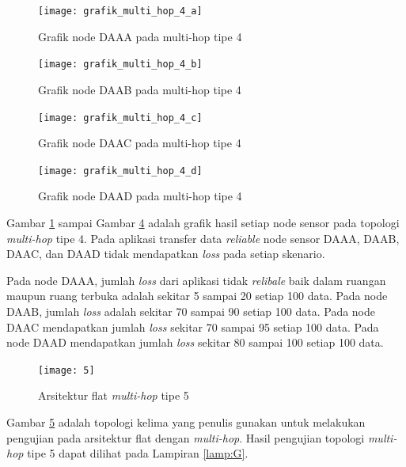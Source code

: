 \begin{figure}[H]
	\centering
	\texttt{[image: grafik\_multi\_hop\_4\_a]}
	\caption{Grafik node DAAA pada multi-hop tipe 4}
	\label{fig:grafik_multi_hop_4_a}
\end{figure}
\begin{figure}[H]
	\centering
	\texttt{[image: grafik\_multi\_hop\_4\_b]}
	\caption{Grafik node DAAB pada multi-hop tipe 4}
	\label{fig:grafik_multi_hop_4_b}
\end{figure}
\begin{figure}[H]
	\centering
	\texttt{[image: grafik\_multi\_hop\_4\_c]}
	\caption{Grafik node DAAC pada multi-hop tipe 4}
	\label{fig:grafik_multi_hop_4_c}
\end{figure}
\begin{figure}[H]
	\centering
	\texttt{[image: grafik\_multi\_hop\_4\_d]}
	\caption{Grafik node DAAD pada multi-hop tipe 4}
	\label{fig:grafik_multi_hop_4_d}
\end{figure}
Gambar \ref{fig:grafik_multi_hop_4_a} sampai Gambar \ref{fig:grafik_multi_hop_4_d} adalah grafik hasil setiap node sensor pada topologi \textit{multi-hop} tipe 4. Pada aplikasi transfer data \textit{reliable} node sensor DAAA, DAAB, DAAC, dan DAAD tidak mendapatkan \textit{loss} pada setiap skenario.

Pada node DAAA, jumlah \textit{loss} dari aplikasi tidak \textit{relibale} baik dalam ruangan maupun ruang terbuka adalah sekitar  5 sampai 20 setiap 100 data. Pada node DAAB, jumlah \textit{loss} adalah sekitar 70 sampai 90 setiap 100 data. Pada node DAAC mendapatkan jumlah \textit{loss} sekitar 70 sampai 95 setiap 100 data. Pada node DAAD mendapatkan jumlah \textit{loss} sekitar 80 sampai 100 setiap 100 data.

\begin{figure}[H]
	\centering
	\texttt{[image: 5]}
	\caption{Arsitektur flat \textit{multi-hop} tipe 5}
	\label{fig:5}
\end{figure}
Gambar \ref{fig:5} adalah topologi kelima yang penulis gunakan untuk melakukan pengujian pada arsitektur flat dengan \textit{multi-hop}. Hasil pengujian topologi \textit{multi-hop} tipe 5 dapat dilihat pada Lampiran \ref{lamp:G}. 

